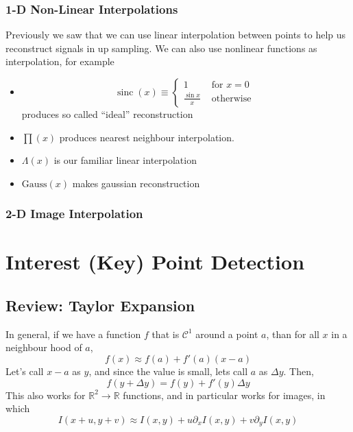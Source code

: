 \documentclass[11pt]{article}
\newcommand{\real}{\mathbb{R}}
\begin{document}
\subsubsection{1-D Non-Linear Interpolations}
Previously we saw that we can use linear interpolation between points to help us reconstruct signals in up sampling. We can also use nonlinear functions as interpolation, for example
\begin{itemize}
	\item \begin{equation}
		\operatorname{sinc}(x) \equiv \left\{\begin{array}{ll}
			1 & \text { for } x=0 \\
			\frac{\sin x}{x} & \text { otherwise }
		\end{array}\right.
	\end{equation} produces so called ``ideal'' reconstruction
	\item $\prod(x)$ produces nearest neighbour interpolation. 
	\item $\Lambda(x)$ is our familiar linear interpolation
	\item $\text{Gauss}(x)$ makes gaussian reconstruction
\end{itemize}


\subsubsection{2-D Image Interpolation}


\section{Interest (Key) Point Detection}
\subsection{Review: Taylor Expansion}
In general, if we have a function $f$ that is $\mathcal C^1$ around a point $a$, than for all $x$ in a neighbour hood of $a$, 
\begin{equation}
	f(x) \approx f(a) + f'(a)(x - a)
\end{equation}
Let's call $x - a$ as $y$, and since the value is small, lets call $a$ as $\Delta y$. Then,
\begin{equation}
	f(y + \Delta y) = f(y) + f'(y)\Delta y
\end{equation}
This also works for $\real^2 \rightarrow \real$ functions, and in particular works for images, in which
\begin{equation}
	I(x+u,y+v) \approx I(x, y) + u\partial_x I(x, y) + v\partial_y I (x, y)
\end{equation}
\end{document}
